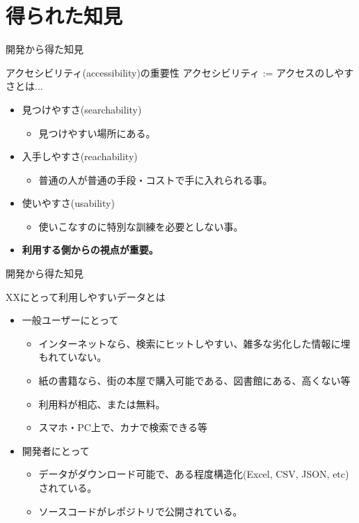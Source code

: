 \documentclass[14pt]{beamer}
\begin{document}
\section{得られた知見}
\begin{frame}{開発から得た知見}
  \begin{block}{アクセシビリティ(accessibility)の重要性}%
    \vspace{0pt}
    アクセシビリティ := アクセスのしやすさとは...
    \begin{itemize}
    \item 見つけやすさ(searchability)
      \begin{itemize}
      \item 見つけやすい場所にある。
      \end{itemize}
    \item 入手しやすさ(reachability)
      \begin{itemize}
      \item 普通の人が普通の手段・コストで手に入れられる事。
      \end{itemize}
    \item 使いやすさ(usability)
      \begin{itemize}
      \item 使いこなすのに特別な訓練を必要としない事。
      \end{itemize}
    \item \textbf{利用する側からの視点が重要。}
    \end{itemize}
  \end{block}
\end{frame}
\begin{frame}{開発から得た知見}
  \begin{block}{XXにとって利用しやすいデータとは}
    \begin{itemize}
    \item 一般ユーザーにとって
      \begin{itemize}
      \item インターネットなら、検索にヒットしやすい、雑多な劣化した情報に埋もれていない。        
      \item 紙の書籍なら、街の本屋で購入可能である、図書館にある、高くない等
      \item 利用料が相応、または無料。
      \item スマホ・PC上で、カナで検索できる等
      \end{itemize}
    \item 開発者にとって
      \begin{itemize}
      \item データがダウンロード可能で、ある程度構造化(Excel, CSV, JSON, etc)されている。
      \item ソースコードがレポジトリで公開されている。
      \end{itemize}
    \end{itemize}
  \end{block}
\end{frame}
\end{document}
